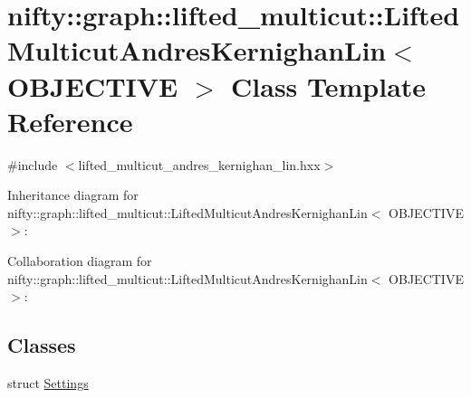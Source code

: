 \hypertarget{classnifty_1_1graph_1_1lifted__multicut_1_1LiftedMulticutAndresKernighanLin}{}\section{nifty\+:\+:graph\+:\+:lifted\+\_\+multicut\+:\+:Lifted\+Multicut\+Andres\+Kernighan\+Lin$<$ O\+B\+J\+E\+C\+T\+I\+V\+E $>$ Class Template Reference}
\label{classnifty_1_1graph_1_1lifted__multicut_1_1LiftedMulticutAndresKernighanLin}


{\ttfamily \#include $<$lifted\+\_\+multicut\+\_\+andres\+\_\+kernighan\+\_\+lin.\+hxx$>$}



Inheritance diagram for nifty\+:\+:graph\+:\+:lifted\+\_\+multicut\+:\+:Lifted\+Multicut\+Andres\+Kernighan\+Lin$<$ O\+B\+J\+E\+C\+T\+I\+V\+E $>$\+:


Collaboration diagram for nifty\+:\+:graph\+:\+:lifted\+\_\+multicut\+:\+:Lifted\+Multicut\+Andres\+Kernighan\+Lin$<$ O\+B\+J\+E\+C\+T\+I\+V\+E $>$\+:
\subsection*{Classes}
\begin{DoxyCompactItemize}
\item 
struct \hyperlink{structnifty_1_1graph_1_1lifted__multicut_1_1LiftedMulticutAndresKernighanLin_1_1Settings}{Settings}
\end{DoxyCompactItemize}
